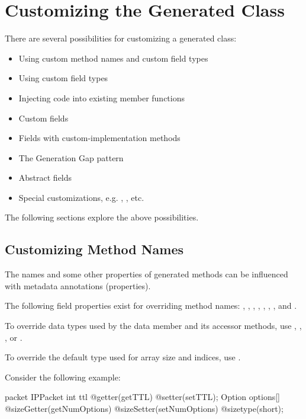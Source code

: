 \section{Customizing the Generated Class}
\label{sec:msg-defs:customizing-generated-class}

There are several possibilities for customizing a generated class:

\begin{itemize}
  \item Using custom method names and custom field types
  \item Using custom field types
  \item Injecting code into existing member functions
  \item Custom fields
  \item Fields with custom-implementation methods
  \item The Generation Gap pattern
  \item Abstract fields
  \item Special customizations, e.g. , , etc.
\end{itemize}

The following sections explore the above possibilities.


\subsection{Customizing Method Names}
\label{sec:msg-defs:customizing-method-names}

The names and some other properties of generated methods can be influenced
with metadata annotations (properties).

The following field properties exist for overriding method names:
, , , ,
, , , 
and .

To override data types used by the data member and its accessor methods, use
, , , or
.

To override the default  type used for array size and indices, use
.

Consider the following example:

\begin{msg}
packet IPPacket {
    int ttl @getter(getTTL) @setter(setTTL);
    Option options[] @sizeGetter(getNumOptions)
                     @sizeSetter(setNumOptions)
                     @sizetype(short);
}
\end{msg}


